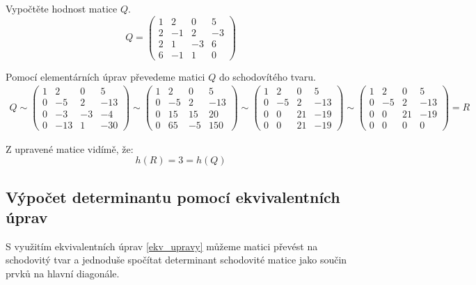\begin{example}
    Vypočtěte hodnost matice $Q$.
    \[Q =
    \begin{pmatrix}
        1 & 2 & 0 & 5 \\
        2 & -1 & 2 & -3\\
        2 & 1 & -3 & 6\\
        6 & -1 & 1 & 0
    \end{pmatrix}
    \]

    Pomocí elementárních úprav převedeme matici $Q$ do schodovítého tvaru.
    \begin{align*}
        Q \sim
        \begin{pmatrix}
            1 & 2 & 0 & 5 \\
            0 & -5 & 2 & -13\\
            0 & -3 & -3 & -4\\
            0 & -13 & 1 & -30
        \end{pmatrix} \sim
        \begin{pmatrix}
            1 & 2 & 0 & 5 \\
            0 & -5 & 2 & -13\\
            0 & 15 & 15 & 20\\
            0 & 65 & -5 & 150
        \end{pmatrix} \sim
        \begin{pmatrix}
            1 & 2 & 0 & 5 \\
            0 & -5 & 2 & -13\\
            0 & 0 & 21 & -19\\
            0 & 0 & 21 & -19
        \end{pmatrix} \sim
        \begin{pmatrix}
            1 & 2 & 0 & 5 \\
            0 & -5 & 2 & -13\\
            0 & 0 & 21 & -19\\
            0 & 0 & 0 & 0
        \end{pmatrix} = R
    \end{align*}

    Z upravené matice vidímě, že:
    $$h(R) = 3 = h(Q)$$
\end{example}

\subsection{Výpočet determinantu pomocí ekvivalentních úprav}
S využitím ekvivalentních úprav \ref{ekv_upravy} můžeme matici převést na
schodovitý tvar a jednoduše spočítat determinant schodovité matice jako
součin prvků na hlavní diagonále.

